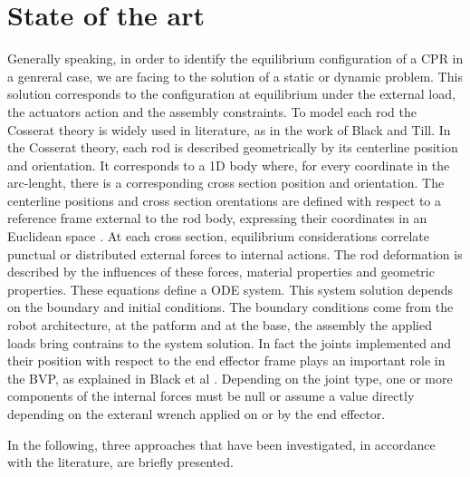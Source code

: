 \documentclass{thesisreport}
\begin{document}
 \chapter{State of the art}
 Generally speaking, in order to identify the equilibrium configuration of a CPR in a genreral case, we are facing to the solution of a static or dynamic problem. This solution corresponds to the configuration at equilibrium under the external load, the actuators action and the assembly constraints. To model each rod the Cosserat theory is widely used in literature, as in the work of Black\cite{black_parallel_2018}\cite{black_modeling_2017} and Till\cite{till_efficient_2015}\cite{till_real-time_2019}. In the Cosserat theory, each rod is described geometrically by its centerline position and orientation. It corresponds to a 1D body where, for every coordinate in the arc-lenght, there is a corresponding cross section position and orientation. The centerline positions and cross section orentations are defined with respect to a reference frame external to the rod body, expressing their coordinates in an Euclidean space \cite{selig_geometric_2005}. 
 At each cross section, equilibrium considerations correlate punctual or distributed external forces to internal actions. The rod deformation is described by the influences of these forces, material properties and geometric properties. These equations define a ODE system. This system solution depends on the boundary and initial conditions. The boundary conditions come from the robot architecture, at the patform and at the base, the assembly the applied loads bring contrains to the system solution. In fact the joints implemented and their position with respect to the end effector frame plays an important role in the BVP, as explained in Black et al \cite{black_parallel_2018}. Depending on the joint type, one or more components of the internal forces must be null or assume a value directly depending on the exteranl wrench applied on or by the end effector.  
 
 In the following, three approaches that have been investigated, in accordance with the literature, are briefly presented.
 
\end{document}
